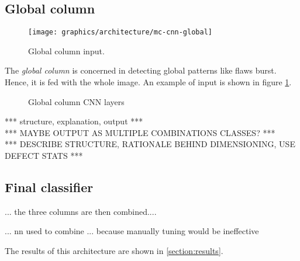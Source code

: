     \subsection{Global column}\label{section:global-column}
        \begin{figure}
            \centering
            \texttt{[image: graphics/architecture/mc-cnn-global]}
            \caption{Global column input.}\label{fig:mc-cnn:global-input}
        \end{figure}
        \par{
            The \emph{global column} is concerned in detecting global patterns like flaws burst. Hence, it is fed with the whole image. An example of input is shown in figure \ref{fig:mc-cnn:global-input}.
        }
        \begin{figure}
            \centering
            \caption{Global column CNN layers}\label{fig:mc-cnn:global-structure}
        \end{figure}
        \par{
            *** structure, explanation, output ***\\
            *** MAYBE OUTPUT AS MULTIPLE COMBINATIONS CLASSES? *** \\
            *** DESCRIBE STRUCTURE, RATIONALE BEHIND DIMENSIONING, USE DEFECT STATS ***
        }
    \subsection{Final classifier}
        \par{
            ... the three columns are then combined....
        }
        \par{
            ... nn used to combine
            ... because manually tuning would be ineffective
        }
        \par{
            The results of this architecture are shown in \ref{section:results}.
        }
